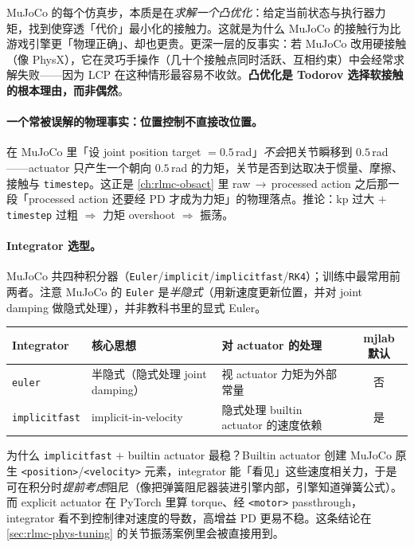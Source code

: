 \begin{insight}[每一步仿真都在解一个优化问题]\label{ins:rlmc-phys-convex}
MuJoCo 的每个仿真步，本质是在\emph{求解一个凸优化}：给定当前状态与执行器力矩，找到使穿透「代价」最小化的接触力。这就是为什么 MuJoCo 的接触行为比游戏引擎更「物理正确」、却也更贵。更深一层的反事实：若 MuJoCo 改用硬接触（像 PhysX），它在灵巧手操作（几十个接触点同时活跃、互相约束）中会经常求解失败——因为 LCP 在这种情形最容易不收敛。\textbf{凸优化是 Todorov 选择软接触的根本理由，而非偶然}。
\end{insight}

\paragraph{一个常被误解的物理事实：位置控制不直接改位置。}在 MuJoCo 里「设 joint position target $=0.5$\,rad」\emph{不会}把关节瞬移到 $0.5$\,rad——actuator 只产生一个朝向 $0.5$\,rad 的力矩，关节是否到达取决于惯量、摩擦、接触与 \verb|timestep|。这正是 \cref{ch:rlmc-obsact} 里 raw\,$\to$\,processed action 之后那一段「processed action 还要经 PD 才成为力矩」的物理落点。推论：kp 过大 $+$ \verb|timestep| 过粗 $\Rightarrow$ 力矩 overshoot $\Rightarrow$ 振荡。

\paragraph{Integrator 选型。}MuJoCo 共四种积分器（\verb|Euler|/\allowbreak\verb|implicit|/\allowbreak\verb|implicitfast|/\allowbreak\verb|RK4|）；训练中最常用前两者。注意 MuJoCo 的 \verb|Euler| 是\emph{半隐式}（用新速度更新位置，并对 joint damping 做隐式处理），并非教科书里的显式 Euler。

\begin{center}
\small
\begin{tabular}{@{}lp{4.4cm}p{4.0cm}c@{}}
\toprule
Integrator & 核心思想 & 对 actuator 的处理 & mjlab 默认 \\
\midrule
\verb|euler| & 半隐式（隐式处理 joint damping） & 视 actuator 力矩为外部常量 & 否 \\
\verb|implicitfast| & implicit-in-velocity & 隐式处理 builtin actuator 的速度依赖 & 是 \\
\bottomrule
\end{tabular}
\end{center}

为什么 \verb|implicitfast| $+$ builtin actuator 最稳？Builtin actuator 创建 MuJoCo 原生 \verb|<position>|/\allowbreak\verb|<velocity>| 元素，integrator 能「看见」这些速度相关力，于是可在积分时\emph{提前考虑}阻尼（像把弹簧阻尼器装进引擎内部，引擎知道弹簧公式）。而 explicit actuator 在 PyTorch 里算 torque、经 \verb|<motor>| passthrough，integrator 看不到控制律对速度的导数，高增益 PD 更易不稳。这条结论在 \cref{sec:rlmc-phys-tuning} 的关节振荡案例里会被直接用到。

